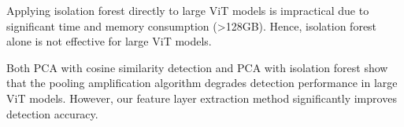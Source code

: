 \documentclass[conference]{IEEEtran}
\begin{document}
Applying isolation forest directly to large ViT models is impractical due to significant time and memory consumption (>128GB). Hence, isolation forest alone is not effective for large ViT models.

Both PCA with cosine similarity detection and PCA with isolation forest show that the pooling amplification algorithm \cite{betterTogether} degrades detection performance in large ViT models. However, our feature layer extraction method significantly improves detection accuracy.

\begin{table}[htbp]
    \caption{Grad Ascent Defense Result}
    \begin{center}
    \label{tab:labelFlip}
    \end{center}
\end{table}
\end{document}
